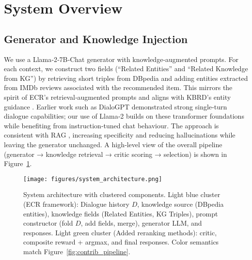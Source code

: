 \documentclass[12pt]{article}
\begin{document}
  \section{System Overview}
  \subsection{Generator and Knowledge Injection}
  We use a Llama‑2‑7B‑Chat generator \citep{meta2023llama2} with knowledge‑augmented prompts. For each context, we construct two fields (``Related Entities'' and ``Related Knowledge from KG'') by retrieving short triples from DBpedia and adding entities extracted from IMDb reviews associated with the recommended item. This mirrors the spirit of ECR's retrieval‑augmented prompts \citep{zhang2024ecr} and aligns with KBRD's entity guidance \citep{chen2020kbrd}. Earlier work such as DialoGPT \citep{zhang2019dialogpt} demonstrated strong single‑turn dialogue capabilities; our use of Llama‑2 builds on these transformer foundations while benefiting from instruction‑tuned chat behaviour. The approach is consistent with RAG \citep{lewis2020rag}, increasing specificity and reducing hallucinations while leaving the generator unchanged. A high‑level view of the overall pipeline (generator → knowledge retrieval → critic scoring → selection) is shown in Figure~\ref{fig:system}.
  
  \begin{figure}[h]
  \centering
  \texttt{[image: figures/system\_architecture.png]}
  \caption{System architecture with clustered components. Light blue cluster (ECR framework): Dialogue history \(D\), knowledge source (DBpedia entities), knowledge fields (Related Entities, KG Triples), prompt constructor (fold \(D\), add fields, merge), generator LLM, and responses. Light green cluster (Added reranking methods): critic, composite reward + argmax, and final responses. Color semantics match Figure~\ref{fig:contrib_pipeline}.}
  \label{fig:system}
  \end{figure}
  
\end{document}
